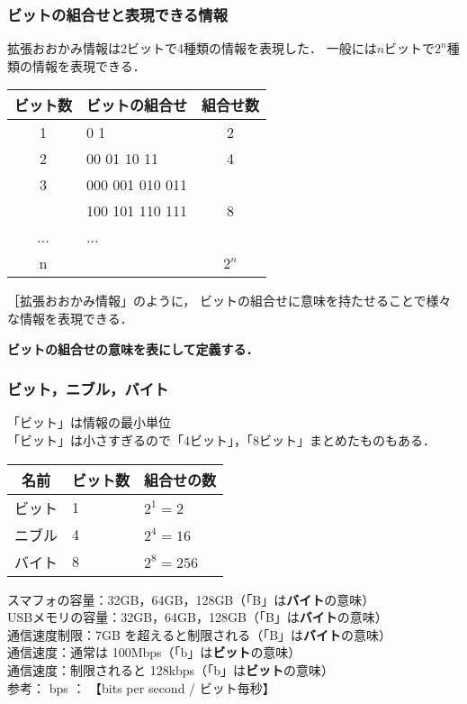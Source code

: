 \documentclass{beamer}                 %
\begin{document}
\begin{frame}
  \frametitle{ビットの組合せと表現できる情報}
  拡張おおかみ情報は2ビットで4種類の情報を表現した．
  一般には$n$ビットで$2^n$種類の情報を表現できる．
  \begin{center}
    {\small\begin{tabular}{c|l|c} \hline\hline
      ビット数 & \multicolumn{1}{c|}{ビットの組合せ} & 組合せ数\\
      \hline
      1 & 0 1   & 2 \\
      2 & 00 01 10 11 & 4 \\
      3 & 000 001 010 011 &   \\
      & 100 101 110 111 & 8 \\
      ...& ... &\\
      n &  & $2^n$ \\
    \end{tabular}}
  \end{center}

  ［拡張おおかみ情報」のように，
  ビットの組合せに意味を持たせることで様々な情報を表現できる．
  \begin{center}
    {\bf ビットの組合せの意味を表にして定義する．}
  \end{center}
\end{frame}

\begin{frame}
  \frametitle{ビット，ニブル，バイト}
  「ビット」は情報の最小単位 \\
  「ビット」は小さすぎるので「4ビット」，「8ビット」まとめたものもある．

  \begin{center}
    {\small\begin{tabular}{c|l|l} \hline\hline
      名前 & ビット数 & 組合せの数\\
      \hline
      ビット & 1   & $2^1 = 2$ \\
      ニブル & 4   & $2^4 = 16$ \\
      バイト & 8   & $2^8 = 256$ \\
    \end{tabular}}
  \end{center}

  スマフォの容量：32GB，64GB，128GB（「B」は{\bf バイト}の意味） \\
  USBメモリの容量：32GB，64GB，128GB（「B」は{\bf バイト}の意味） \\
  通信速度制限：7GB を超えると制限される（「B」は{\bf バイト}の意味） \\
  通信速度：通常は 100Mbps（「b」は{\bf ビット}の意味） \\
  通信速度：制限されると 128kbps（「b」は{\bf ビット}の意味） \\

  参考： bps ： 【bits per second / ビット毎秒】
\end{frame}
\end{document}
